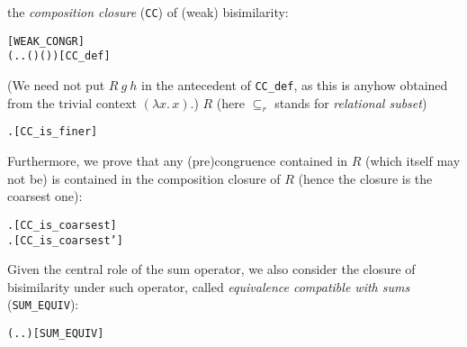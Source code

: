 the \emph{composition closure} (\texttt{CC}) of (weak) bisimilarity:
\begin{alltt}
 \HOLSymConst{=}  \hfill{[WEAK_CONGR]}
  \HOLSymConst{=} (\HOLTokenLambda{} . \HOLSymConst{\HOLTokenForall{}}.   \HOLSymConst{\HOLTokenImp{}}  ( ) ( ))\hfill{[CC_def]}
\end{alltt}
 (We need not  put $R\ g\ h$ in the antecedent of
  \texttt{CC\_def}, as this is anyhow obtained from the trivial context $(\lambda x.\,x)$.)
$R$
(here $\subseteq_r$ stands for \emph{relational subset})
\begin{alltt}
\HOLTokenTurnstile{} \HOLSymConst{\HOLTokenForall{}}.   \HOLSymConst{\HOLTokenRSubset{}} \hfill{[CC_is_finer]}
\end{alltt}
Furthermore, we prove that any (pre)congruence contained in $R$ (which
itself may not be) is contained in the composition closure of $R$
(hence the closure is the coarsest one):
\begin{alltt}
\HOLTokenTurnstile{} \HOLSymConst{\HOLTokenForall{}} .   \HOLSymConst{\HOLTokenConj{}}  \HOLSymConst{\HOLTokenRSubset{}}  \HOLSymConst{\HOLTokenImp{}}  \HOLSymConst{\HOLTokenRSubset{}}  \hfill{[CC_is_coarsest]}
\HOLTokenTurnstile{} \HOLSymConst{\HOLTokenForall{}} .   \HOLSymConst{\HOLTokenConj{}}  \HOLSymConst{\HOLTokenRSubset{}}  \HOLSymConst{\HOLTokenImp{}}  \HOLSymConst{\HOLTokenRSubset{}}  \hfill{[CC_is_coarsest']}
\end{alltt}

Given the central role of the  
 sum operator, we also consider the closure of bisimilarity under such
 operator, called \emph{equivalence compatible with sums}
(\texttt{SUM_EQUIV}): %
\begin{alltt}
 \HOLSymConst{=} (\HOLTokenLambda{} . \HOLSymConst{\HOLTokenForall{}}.  \HOLSymConst{\ensuremath{+}}  \HOLSymConst{\HOLTokenWeakEQ}  \HOLSymConst{\ensuremath{+}} )\hfill{[SUM_EQUIV]}
\end{alltt}

